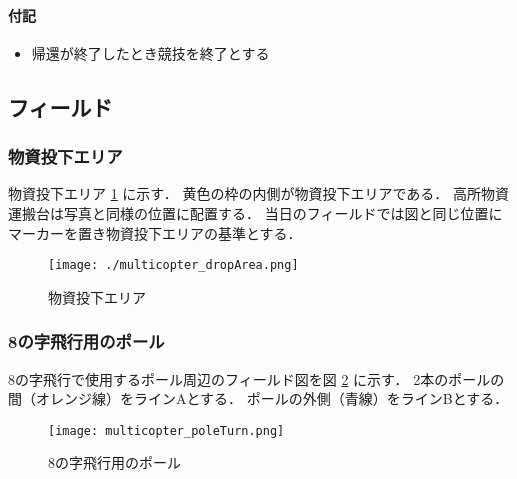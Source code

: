 \paragraph{付記}
\begin{itemize}
\item 帰還が終了したとき競技を終了とする
\end{itemize}


\subsection{フィールド}
\subsubsection{物資投下エリア}
物資投下エリア \ref{fig::multicopter::dropArea} に示す．
黄色の枠の内側が物資投下エリアである．
高所物資運搬台は写真と同様の位置に配置する．
当日のフィールドでは図と同じ位置にマーカーを置き物資投下エリアの基準とする．
\begin{figure}[ht]
  \centering\texttt{[image: ./multicopter\_dropArea.png]}
  \caption{物資投下エリア}
  \label{fig::multicopter::dropArea}
\end{figure}

\newpage
\subsubsection{8の字飛行用のポール}
8の字飛行で使用するポール周辺のフィールド図を図 \ref{fig::multicopter::poleTurn} に示す．
2本のポールの間（オレンジ線）をラインAとする．
ポールの外側（青線）をラインBとする．
\begin{figure}[h]
  \centering\texttt{[image: multicopter\_poleTurn.png]}
  \caption{8の字飛行用のポール}
  \label{fig::multicopter::poleTurn}
\end{figure}